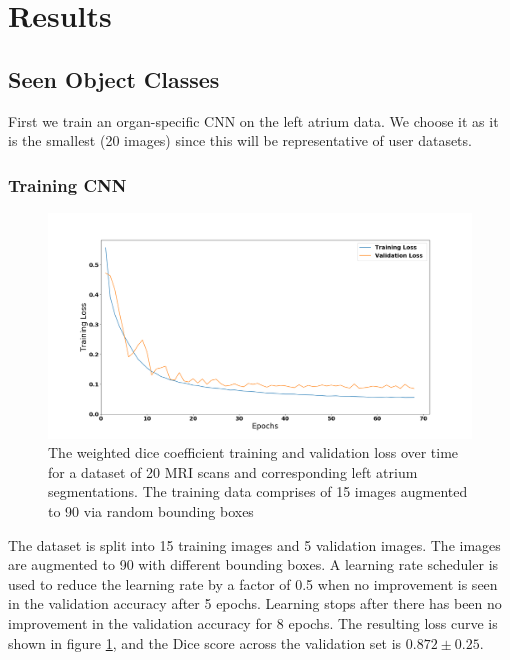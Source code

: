 \section{Results}

\subsection{Seen Object Classes}
First we train an organ-specific CNN on the left atrium data. We choose it as it is the smallest (20 images) since this will be representative of user datasets.

\subsubsection{Training CNN}

\begin{figure}[h!]
\centering
\includegraphics[scale=0.25]{pictures/heartLoss}
\caption{The weighted dice coefficient training and validation loss over time for a dataset of 20 MRI scans and corresponding left atrium segmentations. The training data comprises of 15 images augmented to 90 via random bounding boxes}
\label{fig:lossHeart}
\end{figure}

The dataset is split into 15 training images and 5 validation images. The images are augmented to 90 with different bounding boxes. A learning rate scheduler is used to reduce the learning rate by a factor of 0.5 when no improvement is seen in the validation accuracy after 5 epochs. Learning stops after there has been no improvement in the validation accuracy for 8 epochs. The resulting loss curve is shown in figure \ref{fig:lossHeart}, and the Dice score across the validation set is $0.872 \pm 0.25$.

